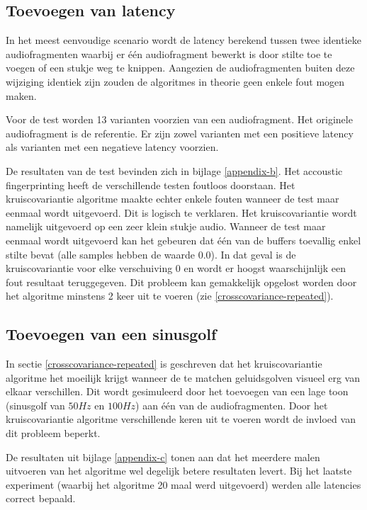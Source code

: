 \subsection{Toevoegen van latency}

In het meest eenvoudige scenario wordt de latency berekend tussen twee identieke audiofragmenten waarbij er één audiofragment bewerkt is door stilte toe te voegen of een stukje weg te knippen. Aangezien de audiofragmenten buiten deze wijziging identiek zijn zouden de algoritmes in theorie geen enkele fout mogen maken.

Voor de test worden 13 varianten voorzien van een audiofragment. Het originele audiofragment is de referentie. Er zijn zowel varianten met een positieve latency als varianten met een negatieve latency voorzien.

De resultaten van de test bevinden zich in bijlage \ref{appendix-b}. Het accoustic fingerprinting heeft de verschillende testen foutloos doorstaan. Het kruiscovariantie algoritme maakte echter enkele fouten wanneer de test maar eenmaal wordt uitgevoerd. Dit is logisch te verklaren. Het kruiscovariantie wordt namelijk uitgevoerd op een zeer klein stukje audio. Wanneer de test maar eenmaal wordt uitgevoerd kan het gebeuren dat één van de buffers toevallig enkel stilte bevat (alle samples hebben de waarde 0.0). In dat geval is de kruiscovariantie voor elke verschuiving 0 en wordt er hoogst waarschijnlijk een fout resultaat teruggegeven. Dit probleem kan gemakkelijk opgelost worden door het algoritme minstens 2 keer uit te voeren (zie \ref{crosscovariance-repeated}).

\subsection{Toevoegen van een sinusgolf}

In sectie \ref{crosscovariance-repeated} is geschreven dat het kruiscovariantie algoritme het moeilijk krijgt wanneer de te matchen geluidsgolven visueel erg van elkaar verschillen. Dit wordt gesimuleerd door het toevoegen van een lage toon (sinusgolf van $50Hz$ en $100Hz$) aan één van de audiofragmenten. Door het kruiscovariantie algoritme verschillende keren uit te voeren wordt de invloed van dit probleem beperkt.

De resultaten uit bijlage \ref{appendix-c} tonen aan dat het meerdere malen uitvoeren van het algoritme wel degelijk betere resultaten levert. Bij het laatste experiment (waarbij het algoritme 20 maal werd uitgevoerd) werden alle latencies correct bepaald.

